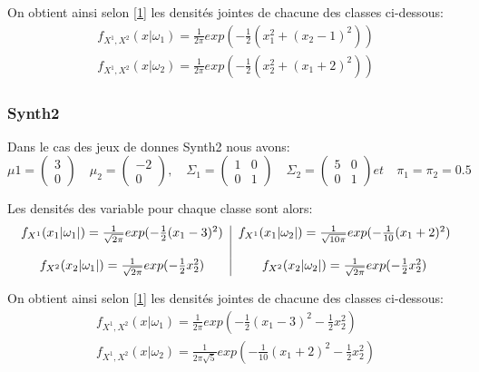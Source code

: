 \documentclass[10pt]{article}
\begin{document}
On obtient ainsi selon \eqref{1} les densités jointes de chacune des classes ci-dessous:
\begin{equation}
\begin{split}
		f_{X^{1}, X^{2}}(x|\omega_{1}) = \frac{1}{2\pi} exp(-\frac{1}{2}(x_{1}^2 + (x_{2}-1)^{2} ))  \\
f_{X^{1}, X^{2}}(x|\omega_{2}) = \frac{1}{2\pi} exp(-\frac{1}{2}(x_{2}^2 + (x_{1}+2)^{2} ))
\end{split}
\label{4}
\end{equation}


\subsubsection{Synth2}
Dans le cas des jeux de donnes Synth2 nous avons:
\[\mu{1}= \begin{pmatrix} 3 \\ 0 \end{pmatrix} \quad \mu_{2}= \begin{pmatrix} -2 \\ 0 \end{pmatrix}, \quad   \Sigma_{1} = \begin{pmatrix} 1 & 0 \\ 0 & 1	\end{pmatrix}  \quad  \Sigma_{2} = \begin{pmatrix} 5 & 0 \\ 0 & 1	\end{pmatrix}  et  \quad \pi_{1} = \pi_{2} = 0.5\]

Les densités des variable pour chaque classe sont alors:
\begin{equation}
\begin{tabular}{c | c}
$f_{X^{1}}(x_{1}|\omega_{1}|) = \frac{1}{\sqrt{2\pi}}exp(-\frac{1}{2} (x_{1} -3 )^{2})$ & 	$f_{X^{1}}(x_{1}|\omega_{2}|) = \frac{1}{\sqrt{10\pi}}exp(-\frac{1}{10} (x_{1}+2)^{2})$\\\\
$f_{X^{2}}(x_{2}|\omega_{1}|) = \frac{1}{\sqrt{2\pi}}exp(-\frac{1}{2} x_{2}^{2})$ & 	$f_{X^{2}}(x_{2}|\omega_{2}|) = \frac{1}{\sqrt{2\pi}}exp(-\frac{1}{2} x_{2}^{2})$\\
\end{tabular}
\label{5}
\end{equation}

On obtient ainsi selon \eqref{1} les densités jointes de chacune des classes ci-dessous:
\begin{equation}
\begin{split}
f_{X^{1}, X^{2}}(x|\omega_{1}) = \frac{1}{2\pi} exp(-\frac{1}{2}(x_{1}-3)^2 - \frac{1}{2}x_{2}^2       )  \\
f_{X^{1}, X^{2}}(x|\omega_{2}) = \frac{1}{2\pi\sqrt{5}} exp(-\frac{1}{10}(x_{1}+2)^{2}  - \frac{1}{2}x_{2}^{2})
\end{split}
\label{6}
\end{equation}
\end{document}
